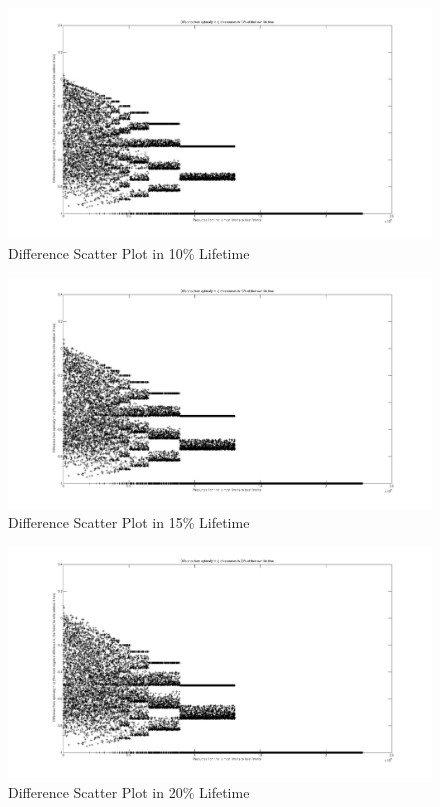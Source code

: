 \documentclass[12pt,a4paper]{report}
\begin{document}
	\vspace{-5cm}
	\begin{figure}
	\hspace{-3.7cm}\includegraphics[width=200mm]{second.jpg}
	\caption{Difference Scatter Plot in 10\% Lifetime}
	\end{figure}

	\vspace{-5cm}
	\begin{figure}
	\hspace{-3.7cm}\includegraphics[width=200mm]{third.jpg}
	\caption{Difference Scatter Plot in 15\% Lifetime}
	\end{figure}

	\vspace{-5cm}
	\begin{figure}
	\hspace{-3.7cm}\includegraphics[width=200mm]{fourth.jpg}
	\caption{Difference Scatter Plot in 20\% Lifetime}
	\end{figure}
\end{document}
